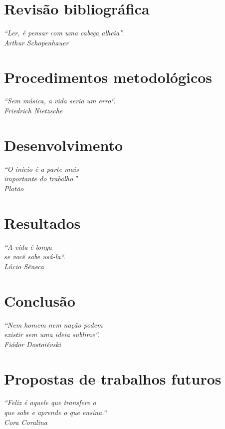 \documentclass[
	11pt,
	openright,
	oneside,
	a4paper,
	english,
	french,
	spanish,
	brazil,	
	]{abntex2}
\newcommand{\quot}[1]{\begin{flushright} \textit{#1}\end{flushright}}
\begin{document}
\chapter{Revisão bibliográfica}
\quot{``Ler, é pensar com uma cabeça alheia''.\\Arthur Schopenhauer}
\label{chapter:metodologia}


\chapter{Procedimentos metodológicos}
\quot{``Sem música, a vida seria um erro``. \\Friedrich Nietzsche}
\label{chapter:procedimentos_metodologicos}


\chapter{Desenvolvimento}
\quot{``O início é a parte mais\\ importante do trabalho.''\\Platão}
\label{chapter:desenvolvimento}


\chapter{Resultados}
\quot{``A vida é longa\\se você sabe usá-la``.\\Lúcio Sêneca}
\label{chapter:resultados}


\chapter{Conclusão}
\quot{``Nem homem nem nação podem\\existir sem uma ideia sublime``.\\Fiódor Dostoiévski}
\label{chapter:conclusao}


\chapter{Propostas de trabalhos futuros}
\quot{``Feliz é aquele que transfere o\\que sabe e aprende o que ensina.``\\Cora Coralina}
\label{chapter:trabalhos_futuros}



\postextual



\printindex
\end{document}
